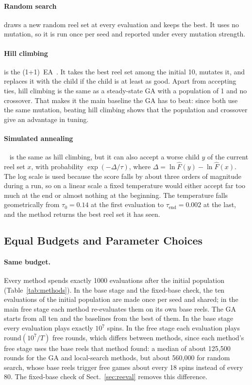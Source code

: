 \paragraph{Random search} draws a new random reel set at every evaluation and keeps the best. It uses no mutation, so it is run once per seed and reported under every mutation strength.

\paragraph{Hill climbing} is the (1+1)~EA~\cite{droste2002analysis}. It takes the best reel set among the initial 10, mutates it, and replaces it with the child if the child is at least as good. Apart from accepting ties, hill climbing is the same as a steady-state GA with a population of 1 and no crossover. That makes it the main baseline the GA has to beat: since both use the same mutation, beating hill climbing shows that the population and crossover give an advantage in tuning.

\paragraph{Simulated annealing}~\cite{kirkpatrick1983optimization} is the same as hill climbing, but it can also accept a worse child $y$ of the current reel set $x$, with probability $\exp(-\Delta/\tau)$, where $\Delta = \ln \hat F(y) - \ln \hat F(x)$. The log scale is used because the score falls by about three orders of magnitude during a run, so on a linear scale a fixed temperature would either accept far too much at the end or almost nothing at the beginning. The temperature falls geometrically from $\tau_0 = 0.14$ at the first evaluation to $\tau_{\mathrm{end}} = 0.002$ at the last, and the method returns the best reel set it has seen.

\subsection{Equal Budgets and Parameter Choices}
\label{sec:fairness}

\paragraph{Same budget.} Every method spends exactly 1000 evaluations after the initial population (Table~\ref{tab:methods}). In the base stage and the fixed-base check, the ten evaluations of the initial population are made once per seed and shared; in the main free stage each method re-evaluates them on its own base reels. The GA starts from all ten and the baselines from the best of them. In the base stage every evaluation plays exactly $10^7$ spins. In the free stage each evaluation plays $\mathrm{round}(10^7/T)$ free rounds, which differs between methods, since each method's free stage uses the base reels that method found: a median of about 125{,}500 rounds for the GA and local-search methods, but about 560{,}000 for random search, whose base reels trigger free games about every 18 spins instead of every 80. The fixed-base check of Sect.~\ref{sec:reeval} removes this difference.

